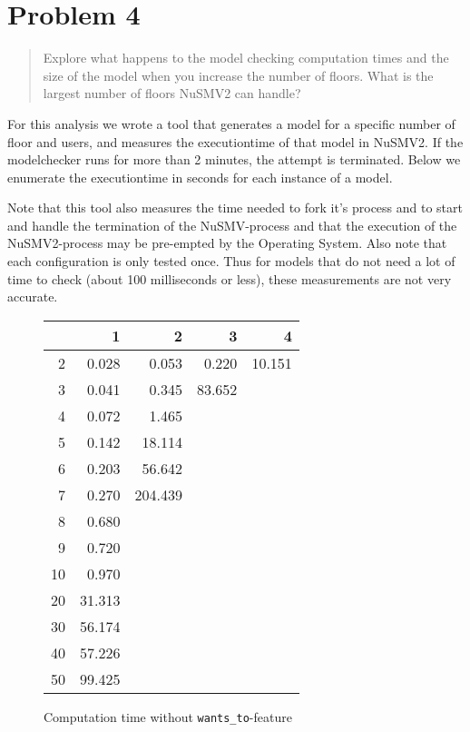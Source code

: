\documentclass[a4paper,10pt]{article}
\begin{document}
	\section{Problem 4}
	
	\begin{quote}
		Explore what happens to the model checking computation times and the size of the model when you increase the number of floors. What is the largest number of floors NuSMV2 can handle?
	\end{quote}
	
	For this analysis we wrote a tool that generates a model for a specific number of floor and users, and measures the executiontime of that model in NuSMV2. If the modelchecker runs for more than 2 minutes, the attempt is terminated. Below we enumerate the executiontime in seconds for each instance of a model.
	
	Note that this tool also measures the time needed to fork it's process and to start and handle the termination of the NuSMV-process and that the execution of the NuSMV2-process may be pre-empted by the Operating System. Also note that each configuration is only tested once. Thus for models that do not need a lot of time to check (about 100 milliseconds or less), these measurements are not very accurate. 
	
	\begin{figure}[H]
		\begin{center}
			\begin{tabular}{r|r|r|r|r}
				\backslashbox{$F$}{$n$} & 1 & 2 & 3 & 4 \\ \hline
				2	& 0.028		& 0.053		& 0.220		& 10.151	\\ \hline
				3	& 0.041		& 0.345		& 83.652	&			\\ \hline
				4	& 0.072		& 1.465		&			&			\\ \hline
				5	& 0.142		& 18.114	&			&			\\ \hline
				6	& 0.203		& 56.642	&			&			\\ \hline 
				7	& 0.270		& 204.439	&			&			\\ \hline
				8	& 0.680		&			&			&			\\ \hline
				9	& 0.720		&			&			&			\\ \hline
				10	& 0.970		&			&			&			\\ \hline
				20	& 31.313	&			&			&			\\ \hline
				30	& 56.174	&			&			&			\\ \hline
				40	& 57.226	&			&			&			\\ \hline
				50	& 99.425	&			&			&			\\ \hline
			\end{tabular}
		\end{center}
		
		\caption{Computation time without \texttt{wants\_to}-feature}
	\end{figure}
	
\end{document}
